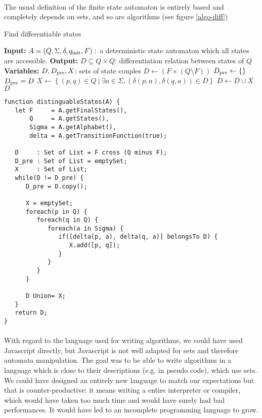 \documentclass{article}
\begin{document}
\begin{sloppypar}
\paragraph{}
The usual definition of the finite state automaton is entirely based and completely depends on sets, and so are algorithms (see figure \ref{algo-diff})

\begin{algorithm}
   \caption{Find differentiable states}
   \label{algo-diff}
   \begin{algorithmic}
      \State \textbf{Input:} $A=(Q, \Sigma, \delta, q_{\rm{init}}, F):$ a deterministic state automaton which all states are accessible.
      \State \textbf{Output:} $D\subseteq Q \times Q$: differentiation relation between states of $ Q $
      \State \textbf{Variables:} $D, D_{\rm{pre}}, X$: sets of state couples
      \State $D \gets \left(F\times (Q \setminus F)\right)$
      \State $D_{\rm{pre}} \gets \{\}$
        \State $D_{\rm{pre}}=D$
        \State $X \gets \left\{(p,q) \in Q\: | \: \exists a \in \Sigma, \left(\delta(p,a), \delta(q,a)\right) \in D\right\}$
        \State $D \gets D \cup X$
      \EndWhile
      \State \Return $D$
   \end{algorithmic}
\end{algorithm}

\lstset{language=JavaScript}

\begin{lstlisting}
function distinguableStates(A) {
   let F     = A.getFinalStates(),
       Q     = A.getStates(),
       Sigma = A.getAlphabet(),
       delta = A.getTransitionFunction(true);

   D     : Set of List = F cross (Q minus F);
   D_pre : Set of List = emptySet;
   X     : Set of List;
   while(D != D_pre) {
      D_pre = D.copy();

      X = emptySet;
      foreach(p in Q) {
         foreach(q in Q) {
            foreach(a in Sigma) {
               if([delta(p, a), delta(q, a)] belongsTo D) {
                  X.add([p, q]);
               }
            }
         }
      }

      D Union= X;
   }
   return D;
}
\end{lstlisting}

\paragraph{}
With regard to the language used for writing algorithms, we could have used Javascript directly, but Javascript is not well adapted for sets and therefore automata manipulation. The goal was to be able to write algorithms in a language which is close to their descriptions (e.g. in pseudo code), which use sets. We could have designed an entirely new language to match our expectations but that is counter-productive: it means writing a entire interpreter or compiler, which would have taken too much time and would have surely had bad performances. It would have led to an incomplete programming language to grow.


\end{sloppypar}
\end{document}
